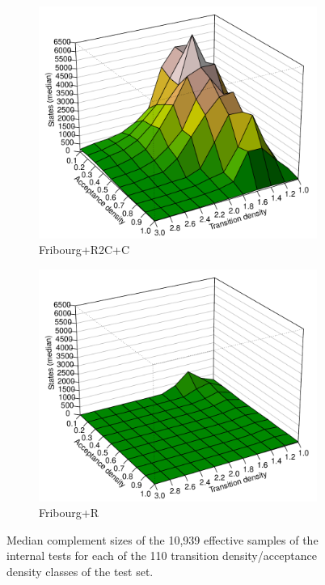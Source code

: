 \begin{figure}[ht]
  \hfill
  \begin{subfigure}[t]{\perspwidth\textwidth}
  \centering
  \includegraphics[width=\textwidth]{../results/figures/internal/goal/s.median.Fribourg+R2C+C.pdf}
  \caption{Fribourg+R2C+C}
  \end{subfigure}
  \hfill
  \begin{subfigure}[t]{\perspwidth\textwidth}
  \centering
  \includegraphics[width=\textwidth]{../results/figures/internal/goal/s.median.Fribourg+R.pdf}
  \caption{Fribourg+R}
  \end{subfigure}
  \hfill  
\caption{Median complement sizes of the 10,939 effective samples of the internal tests for each of the 110 transition density/acceptance density classes of the \goal{} test set.}
\label{i.g.persp_1}
\end{figure}

